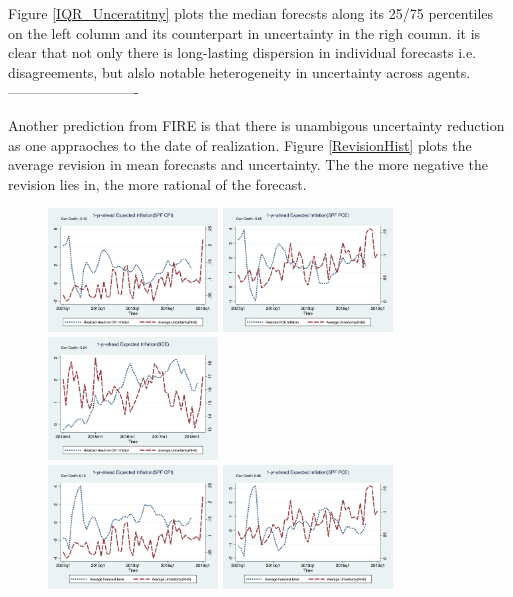 \documentclass[]{article}
\begin{document}
Figure \ref{IQR_Unceratitny} plots the median forecsts along its 25/75 percentiles on the left column and its counterpart in uncertainty in the righ coumn.  it is clear that not only there is long-lasting dispersion in individual forecasts i.e. disagreements, but alslo notable heterogeneity in uncertainty across agents. 
----------------------------
 
Another prediction from FIRE is that there is unambigous uncertainty reduction as one appraoches to the date of realization. Figure \ref{RevisionHist} plots the average revision in mean forecasts and uncertainty. The the more negative the revision lies in, the more rational of the forecast.  


\begin{figure}[ht]
	\centering
	\smallskip
	\includegraphics[width=4.5cm]{figures/Inf1yf_CPIAU_varSPFCPIQ.png}
	\includegraphics[width=4.5cm]{figures/Inf1yf_PCE_varSPFPCEQ.png}
		\includegraphics[width=4.5cm]{figures/Inf1yf_CPIAU_varSCEM.png}\\
	  	\smallskip
		\includegraphics[width=4.5cm]{figures/SPFCPI_FE_varSPFCPIQ.png}
	\includegraphics[width=4.5cm]{figures/SPFPCE_FE_varSPFPCEQ.png}

\end{figure}
\end{document}
